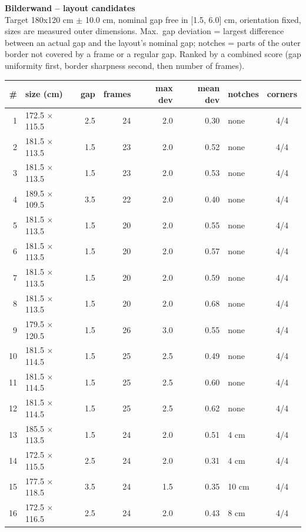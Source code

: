 \documentclass[a4paper,landscape,10pt]{article}
\begin{document}
{\LARGE\bfseries Bilderwand -- layout candidates}\\[4pt]
{\small Target 180x120 cm $\pm$ 10.0 cm, nominal gap free in
[1.5, 6.0] cm, orientation fixed, sizes are measured outer dimensions.
Max.\ gap deviation = largest difference between an actual gap and the layout's nominal gap;
notches = parts of the outer border not covered by a frame or a regular gap. Ranked by a combined
score (gap uniformity first, border sharpness second, then number of frames).}\\[10pt]
\begin{minipage}[t]{0.6\textwidth}\vspace{0pt}
\begin{tabular}{@{}r l r r r r l c@{}}
\toprule
\# & size (cm) & gap & frames & max dev & mean dev & notches & corners \\
\midrule
1 & 172.5 $\times$ 115.5 & 2.5 & 24 & 2.0 & 0.30 & none & 4/4 \\
2 & 181.5 $\times$ 113.5 & 1.5 & 23 & 2.0 & 0.52 & none & 4/4 \\
3 & 181.5 $\times$ 113.5 & 1.5 & 23 & 2.0 & 0.53 & none & 4/4 \\
4 & 189.5 $\times$ 109.5 & 3.5 & 22 & 2.0 & 0.40 & none & 4/4 \\
5 & 181.5 $\times$ 113.5 & 1.5 & 20 & 2.0 & 0.55 & none & 4/4 \\
6 & 181.5 $\times$ 113.5 & 1.5 & 20 & 2.0 & 0.57 & none & 4/4 \\
7 & 181.5 $\times$ 113.5 & 1.5 & 20 & 2.0 & 0.59 & none & 4/4 \\
8 & 181.5 $\times$ 113.5 & 1.5 & 20 & 2.0 & 0.68 & none & 4/4 \\
9 & 179.5 $\times$ 120.5 & 1.5 & 26 & 3.0 & 0.55 & none & 4/4 \\
10 & 181.5 $\times$ 114.5 & 1.5 & 25 & 2.5 & 0.49 & none & 4/4 \\
11 & 181.5 $\times$ 114.5 & 1.5 & 25 & 2.5 & 0.60 & none & 4/4 \\
12 & 181.5 $\times$ 114.5 & 1.5 & 25 & 2.5 & 0.62 & none & 4/4 \\
13 & 185.5 $\times$ 113.5 & 1.5 & 24 & 2.0 & 0.51 & 4 cm & 4/4 \\
14 & 172.5 $\times$ 115.5 & 2.5 & 24 & 2.0 & 0.31 & 4 cm & 4/4 \\
15 & 177.5 $\times$ 118.5 & 3.5 & 24 & 1.5 & 0.35 & 10 cm & 4/4 \\
16 & 172.5 $\times$ 116.5 & 2.5 & 24 & 2.0 & 0.43 & 8 cm & 4/4 \\
\bottomrule
\end{tabular}
\end{minipage}\hfill
\end{document}
